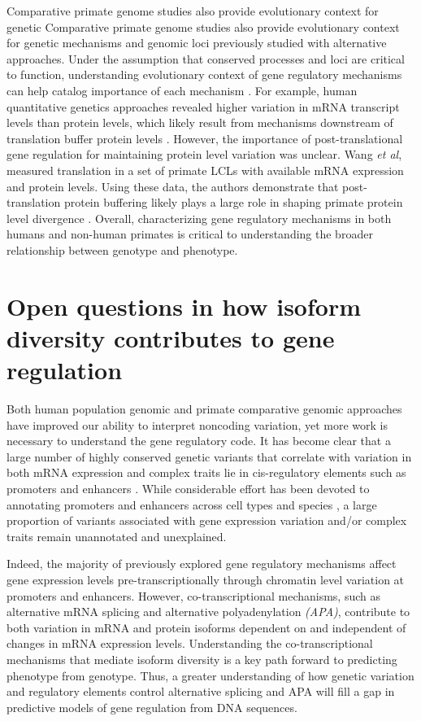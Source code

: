 Comparative primate genome studies also provide evolutionary context for genetic Comparative primate genome studies also provide evolutionary context for genetic mechanisms and genomic loci previously studied with alternative approaches. Under the assumption that conserved processes and loci are critical to function, understanding evolutionary context of gene regulatory mechanisms can help catalog importance of each mechanism \citep{housman_prime_2020}. For example, human quantitative genetics approaches revealed higher variation in mRNA transcript levels than protein levels, which likely result from mechanisms downstream of translation buffer protein levels \citep{battle_impact_2015}. However, the importance of post-translational gene regulation for maintaining protein level variation was unclear. Wang \emph{et al}, measured translation in a set of primate LCLs with available mRNA expression and protein levels. Using these data, the authors demonstrate that post-translation protein buffering likely plays a large role in shaping primate protein level divergence \citep{wang_posttranslational_2018}. Overall, characterizing gene regulatory mechanisms in both humans and non-human primates is critical to understanding the broader relationship between genotype and phenotype. 

\section{Open questions in how isoform diversity contributes to gene regulation}

Both human population genomic and primate comparative genomic approaches have improved our ability to interpret noncoding variation, yet more work is necessary to understand the gene regulatory code.  It has become clear that a large number of highly conserved genetic variants that correlate with variation in both mRNA expression and complex traits lie in cis-regulatory elements such as promoters and enhancers \citep{maurano_systematic_2012, Trynka2013, zhou_epigenetic_2014}. While considerable effort has been devoted to annotating promoters and enhancers across cell types and species \citep{bernstein_nih_2010, the_encode_project_consortium_integrated_2012, mouse_encode_consortium_encyclopedia_2012, modencode_consortium_unlocking_2009}, a large proportion of variants associated with gene expression variation and/or complex traits remain unannotated and unexplained.

Indeed, the majority of previously explored gene regulatory mechanisms affect gene expression levels pre-transcriptionally through chromatin level variation at promoters and enhancers. However, co-transcriptional mechanisms, such as alternative mRNA splicing and alternative polyadenylation \emph{(APA)}, contribute to both variation in mRNA and protein isoforms dependent on and independent of changes in mRNA expression levels. Understanding the co-transcriptional mechanisms that mediate isoform diversity is a key path forward to predicting phenotype from genotype.  Thus, a greater understanding of how genetic variation and regulatory elements control alternative splicing and APA will fill a gap in predictive models of gene regulation from DNA sequences.


